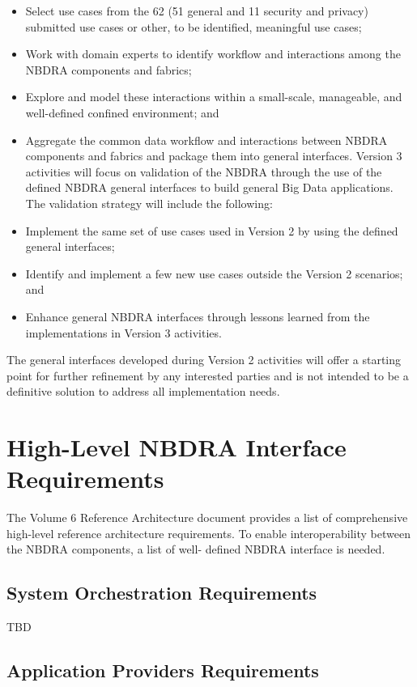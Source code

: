 \documentclass[11pt]{article}
\begin{document}
\begin{itemize}
\item	Select use cases from the 62 (51 general and 11 security and privacy) submitted use cases or 
other, to be identified, meaningful use cases;
\item	Work with domain experts to identify workflow and interactions among the NBDRA 
components and fabrics;
\item	Explore and model these interactions within a small-scale, manageable, and well-defined 
confined environment; and 
\item	Aggregate the common data workflow and interactions between NBDRA components and 
fabrics and package them into general interfaces.
Version 3 activities will focus on validation of the NBDRA through the use of the defined NBDRA 
general interfaces to build general Big Data applications. The validation strategy will include the 
following:
\item	Implement the same set of use cases used in Version 2 by using the defined general interfaces;
\item	Identify and implement a few new use cases outside the Version 2 scenarios; and
\item	Enhance general NBDRA interfaces through lessons learned from the implementations in 
Version 3 activities.
\end{itemize}


The general interfaces developed during Version 2 activities will offer a starting point for further 
refinement by any interested parties and is not intended to be a definitive solution to address all 
implementation needs. 

\section{High-Level NBDRA Interface Requirements}
The Volume 6 Reference Architecture document provides a list of comprehensive high-level reference 
architecture requirements. To enable interoperability between the NBDRA components, a list of well-
defined NBDRA interface is needed.  

\subsection{System Orchestration Requirements}

TBD
\subsection{Application Providers Requirements}
\end{document}
